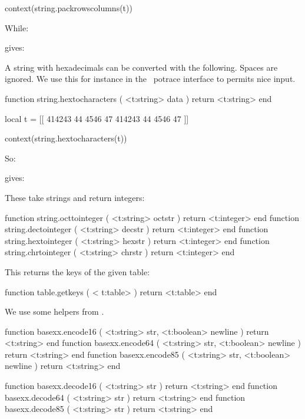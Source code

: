 context(string.packrowscolumns(t))
\stopluacode
\stopbuffer

While:

\typebuffer

gives: \inlinebuffer

A string with hexadecimals can be converted with the following. Spaces are
ignored. We use this for instance in the \METAPOST\ potrace interface to
permits nice input.

\starttyping[option=LUA]
function string.hextocharacters ( <t:string> data )
    return <t:string>
end
\stoptyping

\startbuffer
\startluacode
local t = [[
  414243 44 4546 47
  414243 44 4546 47
]]

context(string.hextocharacters(t))
\stopluacode
\stopbuffer

So:

\typebuffer

gives: \inlinebuffer

These take strings and return integers:

\starttyping[option=LUA]
function string.octtointeger ( <t:string> octstr ) return <t:integer> end
function string.dectointeger ( <t:string> decstr ) return <t:integer> end
function string.hextointeger ( <t:string> hexstr ) return <t:integer> end
function string.chrtointeger ( <t:string> chrstr ) return <t:integer> end
\stoptyping

\stopsubsection

\startsubsection[title=Extra table helpers]

This returns the keys of the given table:

\starttyping[option=LUA]
function table.getkeys ( < t:table> )
    return <t:table>
end
\stoptyping

\stopsubsection

\startsubsection[title=Byte encoding and decoding]

We use some helpers from .

\starttyping[option=LUA]
function basexx.encode16  ( <t:string> str, <t:boolean> newline )
    return <t:string>
end
function basexx.encode64  ( <t:string> str, <t:boolean> newline )
    return <t:string>
end
function basexx.encode85  ( <t:string> str, <t:boolean> newline )
    return <t:string>
end

function basexx.decode16  ( <t:string> str ) return <t:string> end
function basexx.decode64  ( <t:string> str ) return <t:string> end
function basexx.decode85  ( <t:string> str ) return <t:string> end

